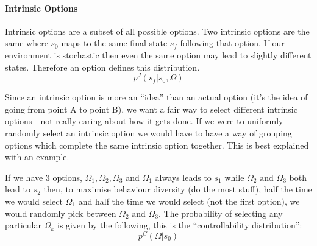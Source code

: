 \documentclass{article}
\begin{document}
\paragraph{Intrinsic Options} Intrinsic options are a subset of all possible options. Two intrinsic options are the same where \(s_{0}\) maps to the same final state \(s_{f}\) following that option. If our environment is stochastic then even the same option may lead to slightly different states. Therefore an option defines this distribution.
\begin{equation}
  \label{eq:3}
  p^{J}(s_{f}|s_{0}, \Omega)
\end{equation}

Since an intrinsic option is more an ``idea'' than an actual option (it's the idea of going from point A to point B), we want a fair way to select different intrinsic options - not really caring about how it gets done.
If we were to uniformly randomly select an intrinsic option we would have to have a way of grouping options which complete the same intrinsic option together. This is best explained with an example.


If we have 3 options, \(\Omega_{1}, \Omega_{2}, \Omega_{3}\) and \(\Omega_{1}\) always leads to \(s_{1}\) while \(\Omega_{2} \text{ and } \Omega_{3}\) both lead to \(s_{2}\) then, to maximise behaviour diversity (do the most stuff), half the time we would select \(\Omega_{1}\) and half the time we would select (not the first option), we would randomly pick between \(\Omega_{2}\) and \(\Omega_{3}\). The probability of selecting any particular \(\Omega_{k}\) is given by the following, this is the ``controllability distribution'':
\begin{equation}
  \label{eq:4}
  p^{C}(\Omega | s_{0})
  \end{equation}
\end{document}
